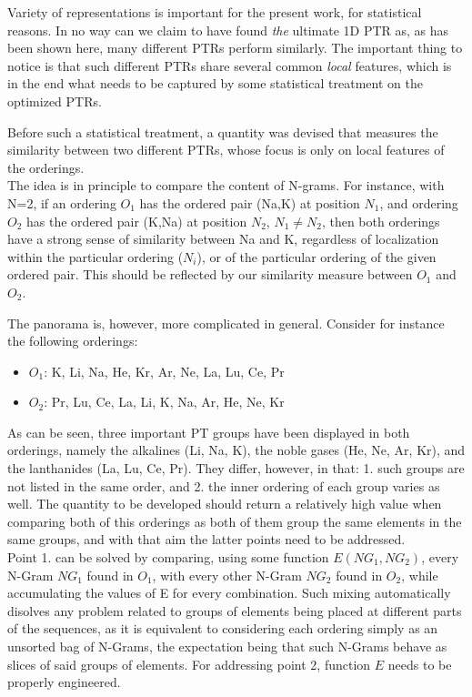 \documentclass[article]{article}
\begin{document}
Variety of representations is important for the present work, for statistical reasons. In no way can we claim to have found \textit{the} ultimate 1D PTR as, as has been shown here, many different PTRs perform similarly. The important thing to notice is that such different PTRs share several common \textit{local} features, which is in the end what needs to be captured by some statistical treatment on the optimized PTRs.

Before such a statistical treatment, a quantity was devised that measures the similarity between two different PTRs, whose focus is only on local features of the orderings.\\



The idea is in principle to compare the content of N-grams. For instance, with N=2, if an ordering $O_1$ has the ordered pair (Na,K) at position $N_1$, and ordering $O_2$ has the ordered pair (K,Na) at position $N_2$, $N_1 \neq N_2$, then both orderings have a strong sense of similarity between Na and K, regardless of localization within the particular ordering ($N_i$), or of the particular ordering of the given ordered pair. This should be reflected by our similarity measure between $O_1$ and $O_2$.

The panorama is, however, more complicated in general. Consider for instance the following orderings:

\begin{itemize}
	\item $O_1$: K, Li, Na, He, Kr, Ar, Ne, La, Lu, Ce, Pr
	\item $O_2$: Pr, Lu, Ce, La, Li, K, Na, Ar, He, Ne, Kr
\end{itemize}

As can be seen, three important PT groups have been displayed in both orderings, namely the alkalines (Li, Na, K), the noble gases (He, Ne, Ar, Kr), and the lanthanides (La, Lu, Ce, Pr). They differ, however, in that: 1. such groups are not listed in the same order, and 2. the inner ordering of each group varies as well. The quantity to be developed should return a relatively high value when comparing both of this orderings as both of them group the same elements in the same groups, and with that aim the latter points need to be addressed.\\

Point 1. can be solved by comparing, using some function $E(NG_1, NG_2)$, every N-Gram $NG_1$ found in $O_1$, with every other N-Gram $NG_2$ found in $O_2$, while accumulating the values of E for every combination. Such mixing automatically disolves any problem related to groups of elements being placed at different parts of the sequences, as it is equivalent to considering each ordering simply as an unsorted bag of N-Grams, the expectation being that such N-Grams behave as slices of said groups of elements. For addressing point 2, function $E$ needs to be properly engineered. \\
\end{document}
